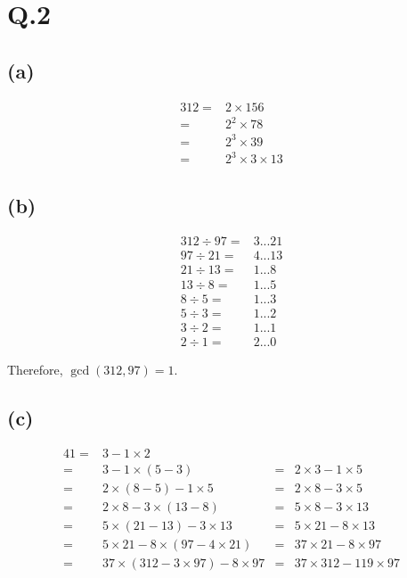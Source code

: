\documentclass[a4paper,12pt]{article}
\begin{document}
\section*{Q.2}

\subsection*{(a)}

\begin{align*}
	312 =& 2 \times 156 \\
	=& 2^2 \times 78 \\
	=& 2^3 \times 39 \\
	=& 2^3 \times 3 \times 13 
\end{align*}

\subsection*{(b)}

\begin{align*}
	312 \div 97 =& 3 ... 21 \\
	97 \div 21 =& 4 ... 13 \\
	21 \div 13 =& 1 ... 8 \\
	13 \div 8 =& 1 ... 5 \\
	8 \div 5 =& 1 ... 3 \\
	5 \div 3 =& 1 ... 2 \\
	3 \div 2 =& 1 ... 1 \\
	2 \div 1 =& 2 ... 0
\end{align*}

Therefore, $\gcd(312,97) = 1$.

\subsection*{(c)}

\begin{alignat*}{4}
	1 =& 3 - 1 \times 2 & &  \\
	=& 3 - 1 \times (5 - 3) &=& 2 \times 3 - 1 \times 5 \\
	=& 2 \times (8 - 5) - 1 \times 5 &=& 2 \times 8 - 3 \times 5 \\
	=& 2 \times 8 - 3 \times (13 - 8) &=& 5 \times 8 - 3 \times 13 \\
	=& 5 \times (21 - 13) - 3 \times 13 &=& 5 \times 21 - 8 \times 13 \\
	=& 5 \times 21 - 8 \times (97 - 4 \times 21) &=& 37 \times 21 - 8 \times 97 \\
	=& 37 \times (312 - 3 \times 97) - 8 \times 97 &=& 37 \times 312 - 119 \times 97
\end{alignat*}
\end{document}
